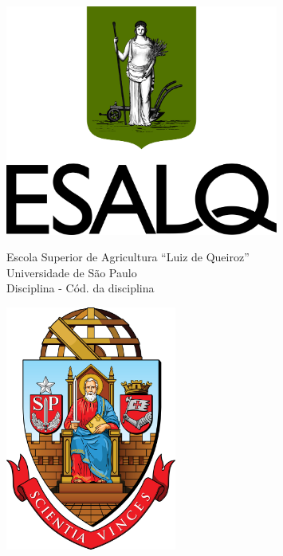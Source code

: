 \documentclass{article}
\begin{document}
\begin{titlepage}
\begin{center}
\begin{figure}[!ht]
				\begin{minipage}{0.15\textwidth}
					\centering
					\includegraphics[width=0.8\textwidth]{Figuras/brasao_esalq2.png} 
				\end{minipage}\hfill
				\begin{minipage}{0.7\textwidth}
					\centering
					\Large{Escola Superior de Agricultura ``Luiz de Queiroz'' }\\ 
					\large{Universidade de São Paulo}\\
					\normalsize{Disciplina - Cód. da disciplina}\\
				\end{minipage}\hfill
				\begin{minipage}{0.15\textwidth}
					\centering
					\includegraphics[width=0.5\textwidth]{Figuras/brasao_usp1.png}
				\end{minipage}
				

\end{figure}
\end{center}
\end{titlepage}
\end{document}

